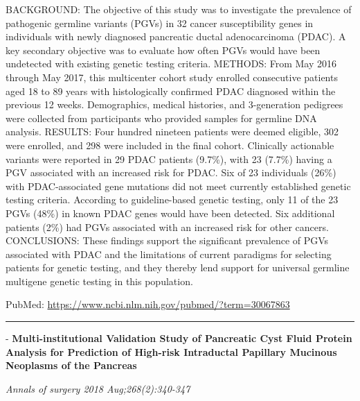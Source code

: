 \documentclass[]{article}
\begin{document}
BACKGROUND: The objective of this study was to investigate the
prevalence of pathogenic germline variants (PGVs) in 32 cancer
susceptibility genes in individuals with newly diagnosed pancreatic
ductal adenocarcinoma (PDAC). A key secondary objective was to evaluate
how often PGVs would have been undetected with existing genetic testing
criteria. METHODS: From May 2016 through May 2017, this multicenter
cohort study enrolled consecutive patients aged 18 to 89 years with
histologically confirmed PDAC diagnosed within the previous 12 weeks.
Demographics, medical histories, and 3-generation pedigrees were
collected from participants who provided samples for germline DNA
analysis. RESULTS: Four hundred nineteen patients were deemed eligible,
302 were enrolled, and 298 were included in the final cohort. Clinically
actionable variants were reported in 29 PDAC patients (9.7\%), with 23
(7.7\%) having a PGV associated with an increased risk for PDAC. Six of
23 individuals (26\%) with PDAC-associated gene mutations did not meet
currently established genetic testing criteria. According to
guideline-based genetic testing, only 11 of the 23 PGVs (48\%) in known
PDAC genes would have been detected. Six additional patients (2\%) had
PGVs associated with an increased risk for other cancers. CONCLUSIONS:
These findings support the significant prevalence of PGVs associated
with PDAC and the limitations of current paradigms for selecting
patients for genetic testing, and they thereby lend support for
universal germline multigene genetic testing in this population.

PubMed: \url{https://www.ncbi.nlm.nih.gov/pubmed/?term=30067863}

{}

{}

\begin{center}\rule{0.5\linewidth}{\linethickness}\end{center}

 - \textbf{Multi-institutional Validation Study of Pancreatic Cyst Fluid
Protein Analysis for Prediction of High-risk Intraductal Papillary
Mucinous Neoplasms of the Pancreas}

\emph{Annals of surgery 2018 Aug;268(2):340-347}
\end{document}
